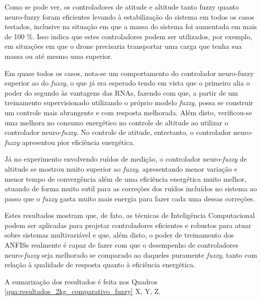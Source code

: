 Como se pode ver, os controladores de atitude e altitude tanto fuzzy quanto neuro-fuzzy foram eficientes levando à estabilização do sistema em todos os casos testados, inclusive na situação em que a massa do sistema foi aumentada em mais de 100 \%. Isso indica que estes controladores podem ser utilizados, por exemplo, em situações em que o drone precisaria transportar uma carga que tenha sua massa ou até mesmo uma superior.

Em quase todos os casos, nota-se um comportamento do controlador neuro-fuzzy superior ao do \textit{fuzzy}, o que já era esperado tendo em vista que o primeiro alia o poder do segundo às vantagens das RNAs, fazendo com que, a partir de um treinamento supervisionado utilizando o próprio modelo \textit{fuzzy}, possa se construir um controle mais abrangente e com resposta melhorada. Além disto, verificou-se uma melhora no consumo energético no controle de altitude ao utilizar o controlador neuro-\textit{fuzzy}. No controle de atitude, entretanto, o controlador neuro-\textit{fuzzy} apresentou pior eficiência energética.

Já no experimento envolvendo ruídos de medição, o controlador neuro-\textit{fuzzy} de altitude se mostrou muito superior ao \textit{fuzzy}, apresentando menor variação e menor tempo de convergência além de uma eficiência energética muito melhor, atuando de forma muito sutil para as correções dos ruídos incluídos no sistema ao passo que o \textit{fuzzy} gasta muito mais energia para fazer cada uma dessas correções.

Estes resultados mostram que, de fato, as técnicas de Inteligência Computacional podem ser aplicadas para projetar controladores eficientes e robustos para atuar sobre sistemas multivariável e que, além disto, o poder de treinamento dos ANFISs realmente é capaz de fazer com que o desempenho de controladores neuro-\textit{fuzzy} seja melhorado se comparado ao daqueles puramente \textit{fuzzy}, tanto com relação à qualidade de resposta quanto à eficiência energética.

A sumarização dos resultados é feita nos Quadros \ref{qua:resultados_2kg_comparativo_fuzzy}  X, Y, Z.



%
